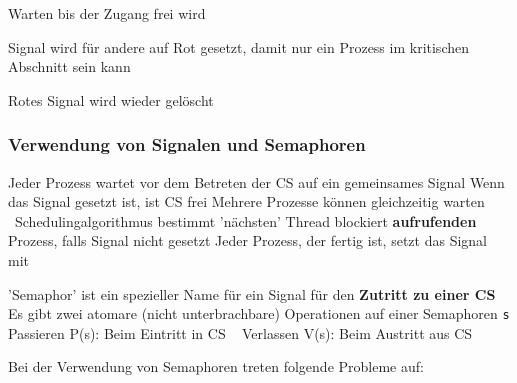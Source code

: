 \begin{minipage}[c]{0.62\columnwidth}
    \raggedright

    \begin{description}
        \setlength\itemsep{2em}
        \item[Zugriffsprüfung:] Warten bis der Zugang frei wird
        \item[Sperren:] Signal wird für andere auf Rot gesetzt, damit nur ein Prozess im kritischen Abschnitt sein kann
        \item[Freigeben:] Rotes Signal wird wieder gelöscht
    \end{description}
\end{minipage}
\hfill
\begin{minipage}[c]{0.37\columnwidth}
    
\end{minipage}


\subsubsection{Verwendung von Signalen und Semaphoren}

\begin{outline}
    \1 Jeder Prozess wartet vor dem Betreten der CS auf ein gemeinsames Signal
        \2 Wenn das Signal gesetzt ist, ist CS frei
        \2 Mehrere Prozesse können gleichzeitig warten \textrightarrow\ Schedulingalgorithmus bestimmt 'nächsten' Thread 
    \1  blockiert \textbf{aufrufenden} Prozess, falls Signal nicht gesetzt
    \1 Jeder Prozess, der fertig ist, setzt das Signal mit 
\end{outline}



\begin{outline}
    \1 'Semaphor' ist ein spezieller Name für ein Signal für den \textbf{Zutritt zu einer CS}
    \1 Es gibt zwei atomare (nicht unterbrachbare) Operationen auf einer Semaphoren \lstinline|s|
        \2 Passieren P(s): Beim Eintritt in CS \textrightarrow\ 
        \2 Verlassen V(s): Beim Austritt aus CS \textrightarrow\ 
\end{outline}

\vspace{0.2cm}

Bei der Verwendung von Semaphoren treten folgende Probleme auf:

\vspace{0.1cm}

